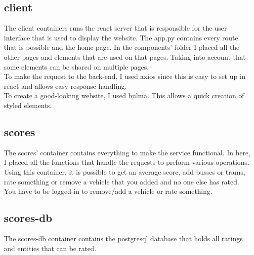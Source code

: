 \documentclass[12pt,a4paper]{article}
\begin{document}
\subsection{client}
The client containers runs the react server that is responsible for the user interface that is used to display the website. The app.py contains every route that is possible and the home page. In the components' folder I placed all the other pages and elements that are used on that pages. Taking into account that some elements can be shared on multiple pages.\\

To make the request to the back-end, I used axios since this is easy to set up in react and allows easy response handling.\\
To create a good-looking website, I used bulma. This allows a quick creation of styled elements.

\subsection{scores}
The scores' container contains everything to make the service functional. In here, I placed all the functions that handle the requests to preform various operations. Using this container, it is possible to get an average score, add busses or trams, rate something or remove a vehicle that you added and no one else has rated.\\

You have to be logged-in to remove/add a vehicle or rate something.

\subsection{scores-db}
The scores-db container contains the postgresql database that holds all ratings and entities that can be rated.\\
\end{document}
